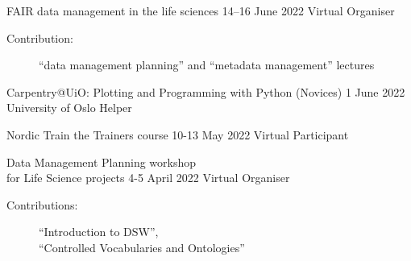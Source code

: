 \documentclass[10pt,a4paper,ragged2e,withhyper]{altacv}
\begin{document}
\begin{paracol}{2}
\cveventrole{}
            {FAIR data management in the life sciences}
            {14--16 June 2022}
            {Virtual}
            {Organiser}
            \small{
              \begin{description}
              \item[Contribution:]
                ``data management planning'' and ``metadata management'' lectures
              \end{description}
              }
            
\smallskip

\cveventrole{}
        {Carpentry@UiO: Plotting and Programming with Python (Novices)}
        {1 June 2022}
        {University of Oslo}
        {Helper}

\smallskip

\cveventrole{}
            {Nordic Train the Trainers course}
            {10-13 May 2022}
            {Virtual}
            {Participant}

\smallskip

\cveventrole{}
            {Data Management Planning workshop\\ for Life Science projects}
            {4-5 April 2022}
            {Virtual}
            {Organiser}
            \small{
              \begin{description}
              \item[Contributions:]
                ``Introduction to DSW'',\\ ``Controlled Vocabularies and Ontologies''
              \end{description}
              }


        
\medskip
{}


\divider


\divider

\\
\smallskip
{}

\divider



\end{paracol}
\end{document}
